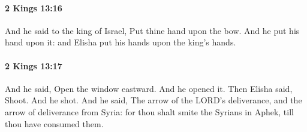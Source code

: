 		\paragraph{2 Kings 13:16} %
			\label{2KINGS-13-16}

			And he said to the king of Israel, Put thine hand upon the bow. And he put his hand upon it: and Elisha put his hands upon the king’s hands.


		\paragraph{2 Kings 13:17} %
			\label{2KINGS-13-17}

			And he said, Open the window eastward. And he opened it. Then Elisha said, Shoot. And he shot. And he said, The arrow of the LORD’s deliverance, and the arrow of deliverance from Syria: for thou shalt smite the Syrians in Aphek, till thou have consumed them.


